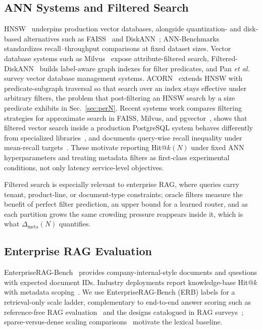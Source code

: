 \documentclass{ieeeaccess}
\makeatletter
\DeclareRobustCommand{\_}{\ifmmode\nfss@text{\textunderscore}\else\textunderscore\allowbreak\fi}
\makeatother
\begin{document}
\subsection{ANN Systems and Filtered Search}
HNSW~\cite{malkov2018hnsw} underpins production vector databases, alongside quantization- and disk-based alternatives such as FAISS~\cite{johnson2021faiss} and DiskANN~\cite{subramanya2019diskann}; ANN-Benchmarks~\cite{aumuller2020annb} standardizes recall--throughput comparisons at fixed dataset sizes. Vector database systems such as Milvus~\cite{wang2021milvus} expose attribute-filtered search, Filtered-DiskANN~\cite{gollapudi2023filtered} builds label-aware graph indexes for filter predicates, and Pan \emph{et al.}~\cite{pan2024vdbms} survey vector database management systems. ACORN~\cite{patel2024acorn} extends HNSW with predicate-subgraph traversal so that search over an index stays effective under arbitrary filters, the problem that post-filtering an HNSW search by a size predicate exhibits in Sec.~\ref{sec:perN}. Recent systems work compares filtering strategies for approximate search in FAISS, Milvus, and pgvector~\cite{amanbayev2026fanns}, shows that filtered vector search inside a production PostgreSQL system behaves differently from specialized libraries~\cite{lu2026pgfvs}, and documents query-wise recall inequality under mean-recall targets~\cite{shahri2026rcheck}. These motivate reporting Hit@$k(N)$ under fixed ANN hyperparameters and treating metadata filters as first-class experimental conditions, not only latency service-level objectives.

Filtered search is especially relevant to enterprise RAG, where queries carry tenant, product-line, or document-type constraints; oracle filters measure the benefit of perfect filter prediction, an upper bound for a learned router, and as each partition grows the same crowding pressure reappears inside it, which is what $\Delta_{\mathrm{meta}}(N)$ quantifies.

\subsection{Enterprise RAG Evaluation}
EnterpriseRAG-Bench~\cite{sun2026erb} provides company-internal-style documents and questions with expected document IDs. Industry deployments report knowledge-base Hit@$k$ with metadata scoping~\cite{ragfusion2026}. We use EnterpriseRAG-Bench (ERB) labels for a retrieval-only scale ladder, complementary to end-to-end answer scoring such as reference-free RAG evaluation~\cite{es2024ragas} and the designs catalogued in RAG surveys~\cite{gao2023ragsurvey}; sparse-versus-dense scaling comparisons~\cite{zeng2025sparse} motivate the lexical baseline.
\end{document}
